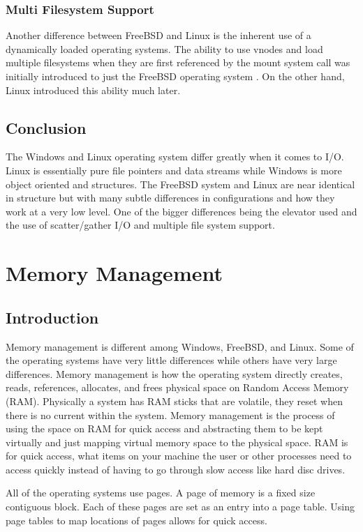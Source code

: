 \documentclass[draftclsnofoot, onecolumn, compsoc, 10pt]{IEEEtran}
\begin{document}
\subsubsection{Multi Filesystem Support}
Another difference between FreeBSD and Linux is the inherent use of a dynamically loaded operating systems. The ability to use vnodes and load multiple filesystems when they are first referenced by the mount system call was initially introduced to just the FreeBSD operating system \cite{FreeBSDIO}. On the other hand, Linux introduced this ability much later. 



\subsection{Conclusion}
The Windows and Linux operating system differ greatly when it comes to I/O. Linux is essentially pure file pointers and data streams while Windows is more object oriented and structures. The FreeBSD system and Linux are near identical in structure but with many subtle differences in configurations and how they work at a very low level. One of the bigger differences being the elevator used and the use of scatter/gather I/O and multiple file system support.


\section{Memory Management}
\subsection{Introduction}
Memory management is different among Windows, FreeBSD, and Linux. Some of the operating systems have very little differences while others have very large differences. Memory management is how the operating system directly creates, reads, references, allocates, and frees physical space on Random Access Memory (RAM). Physically a system has RAM sticks that are volatile, they reset when there is no current within the system. Memory management is the process of using the space on RAM for quick access and abstracting them to be kept virtually and just mapping virtual memory space to the physical space. RAM is for quick access, what items on your machine the user or other processes need to access quickly instead of having to go through slow access like hard disc drives. 

All of the operating systems use pages. A page of memory is a fixed size contiguous block. Each of these pages are set as an entry into a page table. Using page tables to map locations of pages allows for quick access.
\end{document}
